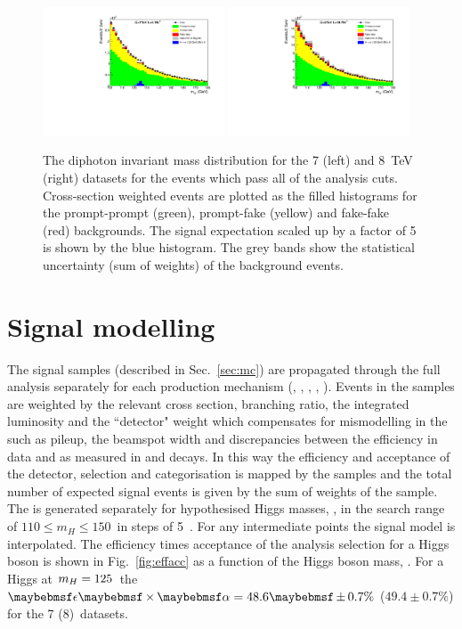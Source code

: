 \begin{figure}
  \includegraphics[width=0.48\textwidth]{analysis/plots/mgg_bkg_7TeV.pdf}
  \includegraphics[width=0.48\textwidth]{analysis/plots/mgg_bkg_8TeV.pdf}
  \caption[Diphoton invariant mass distributions for the datasets at 7 and 8~TeV]{The diphoton invariant mass distribution for the 7 (left) and 8~TeV (right) datasets for the events which pass all of the analysis cuts. Cross-section weighted \MC events are plotted as the filled histograms for the prompt-prompt (green), prompt-fake (yellow) and fake-fake (red) backgrounds. The \SM signal expectation scaled up by a factor of 5 is shown by the blue histogram. The grey bands show the statistical uncertainty (sum of weights) of the background \MC events.}
  \label{fig:inv_mass_plots}
\end{figure}

\section{Signal modelling}
\label{sec:signal_model}

The signal \MC samples (described in Sec.~\ref{sec:mc}) are propagated through the full analysis separately for each production mechanism (\ggH, \VBF, \WH, \ZH, \ttH). Events in the samples are weighted by the relevant \SM cross section, branching ratio, the integrated luminosity and the ``detector" weight which compensates for mismodelling in the \MC such as pileup, the beamspot width and discrepancies between the efficiency in data and \MC as measured in \Zee and \Zmumugamma decays. In this way the efficiency and acceptance of the detector, selection and categorisation is mapped by the \MC samples and the total number of expected \SM signal events is given by the sum of weights of the sample. The \MC is generated separately for hypothesised Higgs masses, \mH, in the search range of $110 \leq m_{H} \leq 150$~\GeV in steps of 5~\GeV. For any intermediate points the signal model is interpolated. The efficiency times acceptance of the analysis selection for a \SM Higgs boson is shown in Fig.~\ref{fig:effacc} as a function of the Higgs boson mass, \mH. For a Higgs at $m_{H}=125$~\GeV the $\ea=48.6\pm 0.7\%$ ($49.4\pm 0.7\%$) for the 7 (8)~\TeV datasets.

